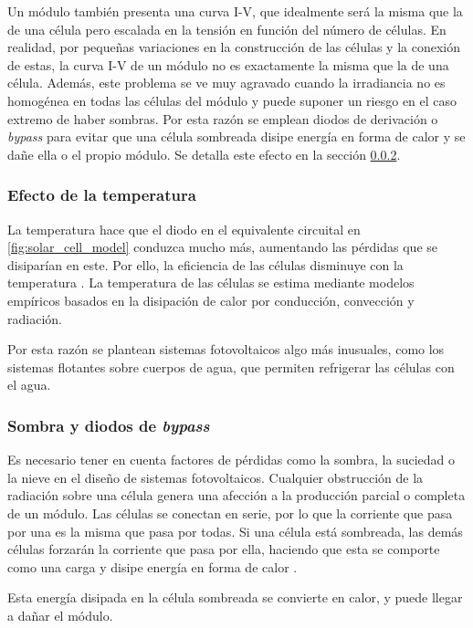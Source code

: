 Un \gls{módulo} también presenta una curva I-V, que idealmente será la misma que la de una célula pero escalada en la tensión en función del número de células. En realidad, por pequeñas variaciones en la construcción de las células y la conexión de estas, la \gls{curva I-V} de un módulo no es exactamente la misma que la de una célula. Además, este problema se ve muy agravado cuando la \gls{irradiancia} no es homogénea en todas las células del módulo y puede suponer un riesgo en el caso extremo de haber sombras. Por esta razón se emplean diodos de derivación o \textit{bypass} para evitar que una célula sombreada disipe energía en forma de calor y se dañe ella o el propio módulo. Se detalla este efecto en la sección \ref{sssct:efecto-sombra}.

\subsubsection{Efecto de la temperatura}

La temperatura hace que el \gls{diodo} en el equivalente circuital en \ref{fig:solar_cell_model} conduzca mucho más, aumentando las pérdidas que se disiparían en este. Por ello, la eficiencia de las células disminuye con la temperatura \cite{Perpinan2020}. La temperatura de las células se estima mediante modelos empíricos basados en la disipación de calor por conducción, convección y radiación.

Por esta razón se plantean sistemas fotovoltaicos algo más inusuales, como los \gls{sistemas flotantes} sobre cuerpos de agua, que permiten refrigerar las células con el agua.

\subsubsection{Sombra y diodos de \textit{bypass}} \label{sssct:efecto-sombra}

Es necesario tener en cuenta factores de pérdidas como la \gls{sombra}, la suciedad o la nieve en el diseño de sistemas fotovoltaicos. Cualquier obstrucción de la radiación sobre una célula genera una afección a la producción parcial o completa de un \gls{módulo}. Las células se conectan en serie, por lo que la corriente que pasa por una es la misma que pasa por todas. Si una célula está sombreada, las demás células forzarán la corriente que pasa por ella, haciendo que esta se comporte como una \gls{carga} y disipe energía en forma de calor \cite{Perpinan2020}.

Esta energía disipada en la célula sombreada se convierte en calor, y puede llegar a dañar el módulo.

